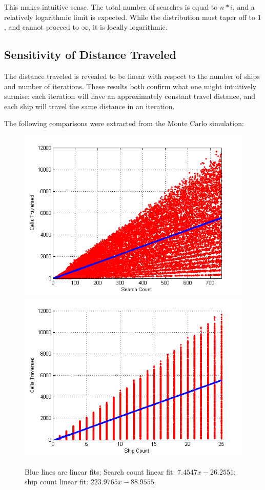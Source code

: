 \documentclass[a4paper]{article}
\begin{document}
This makes intuitive sense. The total number of searches is equal to $n*i$, and a relatively logarithmic limit is expected. While the distribution must taper off to $1$, and cannot proceed to $\infty$, it is locally logarithmic.

\subsection{Sensitivity of Distance Traveled}

The distance traveled is revealed to be linear with respect to the number of ships and number of iterations. These results both confirm what one might intuitively surmise: each iteration will have an approximately constant travel distance, and each ship will travel the same distance in an iteration.

The following comparisons were extracted from the Monte Carlo simulation:

\begin{figure}[H]\begin{center}
\includegraphics[scale=0.5]{../Matlab/Images/DistTraveledByIterCount.png}
\includegraphics[scale=0.5]{../Matlab/Images/DistTraveledByShipCount.png}
\caption{Blue lines are linear fits; Search count linear fit: $7.4547x-26.2551$; ship count linear fit: $223.9765x-88.9555$.}
\end{center}\end{figure}
\end{document}
